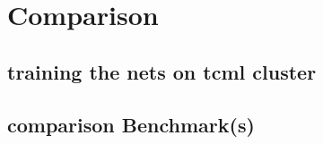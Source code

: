 \chapter{Comparison}

\section{training the nets on tcml cluster}

\section{comparison Benchmark(s)}

